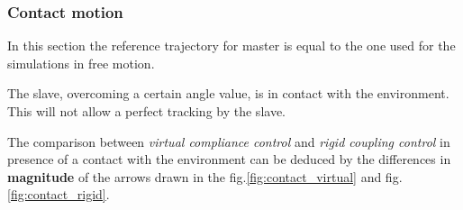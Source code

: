\subsubsection{Contact motion}


In this section the reference trajectory for master is equal to the one used for the simulations in free motion.


The slave, overcoming a certain angle value, is in contact with the environment. This will not allow a perfect tracking by the slave.

The comparison between \textsl{virtual compliance control} and \textsl{rigid coupling control} in presence of a contact with the environment can be deduced by the
differences in \textbf{magnitude} of the arrows drawn in the fig.\ref{fig:contact_virtual} and fig.\ref{fig:contact_rigid}.

